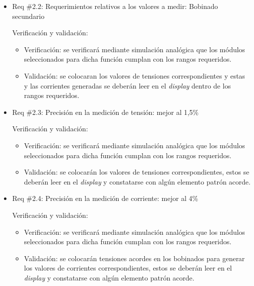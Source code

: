\documentclass[11pt]{charter}
\begin{document}
\begin{itemize} 
\item Req \#2.2: Requerimientos relativos a los valores a medir: Bobinado secundario

Verificación y validación:

\begin{itemize}
\item Verificación: se verificará mediante simulación analógica que los módulos seleccionados para dicha función cumplan con los rangos requeridos.
\item Validación: se colocaran los valores de tensiones correspondientes y estas y las corrientes generadas se deberán leer en el \textit{display} dentro de los rangos requeridos.
\end{itemize}

\end{itemize}

\begin{itemize} 
\item Req \#2.3: Precisión en la medición de tensión: mejor al 1,5\% 

Verificación y validación:

\begin{itemize}
\item Verificación: se verificará mediante simulación analógica que los módulos seleccionados para dicha función cumplan con los rangos requeridos.
\item Validación: se colocarán los valores de tensiones correspondientes, estos se deberán leer en el \textit{display} y constatarse con algún elemento patrón acorde.  
\end{itemize}

\end{itemize}

\begin{itemize} 
\item Req \#2.4: Precisión en la medición de corriente: mejor al 4\% 

Verificación y validación:

\begin{itemize}
\item Verificación: se verificará mediante simulación analógica que los módulos seleccionados para dicha función cumplan con los rangos requeridos.
\item Validación: se colocarán tensiones acordes en los bobinados para generar los valores de corrientes correspondientes, estos se deberán leer en el \textit{display} y constatarse con algún elemento patrón acorde.  
\end{itemize}

\end{itemize}
\end{document}

